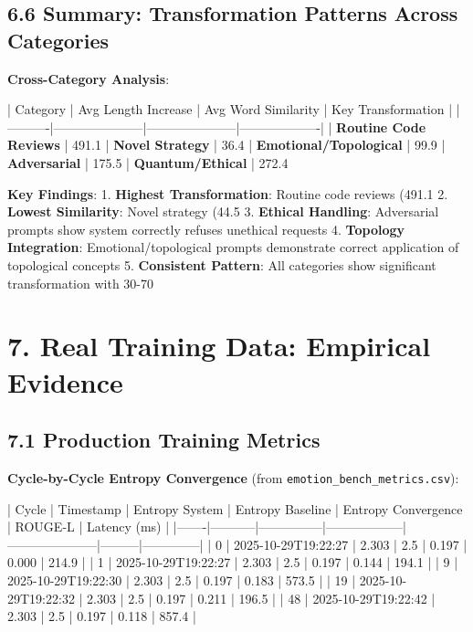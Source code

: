 \documentclass[11pt,a4paper]{article}
\begin{document}
\subsection{6.6 Summary: Transformation Patterns Across Categories}

\textbf{Cross-Category Analysis}:

| Category | Avg Length Increase | Avg Word Similarity | Key Transformation |
|----------|---------------------|---------------------|-------------------|
| \textbf{Routine Code Reviews} | 491.1%
| \textbf{Novel Strategy} | 36.4%
| \textbf{Emotional/Topological} | 99.9%
| \textbf{Adversarial} | 175.5%
| \textbf{Quantum/Ethical} | 272.4%

\textbf{Key Findings}:
1. \textbf{Highest Transformation}: Routine code reviews (491.1%
2. \textbf{Lowest Similarity}: Novel strategy (44.5%
3. \textbf{Ethical Handling}: Adversarial prompts show system correctly refuses unethical requests
4. \textbf{Topology Integration}: Emotional/topological prompts demonstrate correct application of topological concepts
5. \textbf{Consistent Pattern}: All categories show significant transformation with 30-70%

\section{7. Real Training Data: Empirical Evidence}

\subsection{7.1 Production Training Metrics}

\textbf{Cycle-by-Cycle Entropy Convergence} (from \texttt{emotion_bench_metrics.csv}):

| Cycle | Timestamp | Entropy System | Entropy Baseline | Entropy Convergence | ROUGE-L | Latency (ms) |
|-------|-----------|---------------|------------------|---------------------|---------|--------------|
| 0 | 2025-10-29T19:22:27 | 2.303 | 2.5 | 0.197 | 0.000 | 214.9 |
| 1 | 2025-10-29T19:22:27 | 2.303 | 2.5 | 0.197 | 0.144 | 194.1 |
| 9 | 2025-10-29T19:22:30 | 2.303 | 2.5 | 0.197 | 0.183 | 573.5 |
| 19 | 2025-10-29T19:22:32 | 2.303 | 2.5 | 0.197 | 0.211 | 196.5 |
| 48 | 2025-10-29T19:22:42 | 2.303 | 2.5 | 0.197 | 0.118 | 857.4 |
\end{document}
